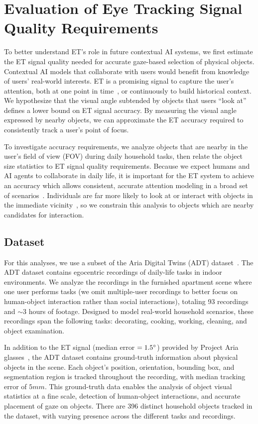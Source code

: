 \section{Evaluation of Eye Tracking Signal Quality Requirements}

To better understand ET's role in future contextual AI systems, we first estimate the ET signal quality needed for accurate gaze-based selection of physical objects.  Contextual AI models that collaborate with users would benefit from knowledge of users' real-world interests.  ET is a promising signal to capture the user's attention, both at one point in time~\cite{konrad_gazegpt_2024}, or continuously to build historical context.  We hypothesize that the visual angle subtended by objects that users ``look at'' defines a lower bound on ET signal accuracy.  By measuring the visual angle expressed by nearby objects, we can approximate the ET accuracy required to consistently track a user's point of focus.

To investigate accuracy requirements, we analyze objects that are nearby in the user's field of view (FOV) during daily household tasks, then relate the object size statistics to ET signal quality requirements.  Because we expect humans and AI agents to collaborate in daily life, it is important for the ET system to achieve an accuracy which allows consistent, accurate attention modeling in a broad set of scenarios~\cite{feit2017toward}.  Individuals are far more likely to look at or interact with objects in the immediate vicinity~\cite{ballendat_proxemic_2010}, so we constrain this analysis to objects which are nearby candidates for interaction.

\subsection{Dataset}

For this analyses, we use a subset of the Aria Digital Twins (ADT) dataset~\cite{pan_adt_2023}.  The ADT dataset contains egocentric recordings of daily-life tasks in indoor environments.  We analyze the recordings in the furnished apartment scene where one user performs tasks (we omit multiple-user recordings to better focus on human-object interaction rather than social interactions), totaling 93 recordings and $\sim$3 hours of footage.  Designed to model real-world household scenarios, these recordings span the following tasks:  decorating, cooking, working, cleaning, and object examination.

In addition to the ET signal (median error $= 1.5\degree$) provided by Project Aria glasses~\cite{engel_aria_2023}, the ADT dataset contains ground-truth information about physical objects in the scene.  Each object's position, orientation, bounding box, and segmentation region is tracked throughout the recording, with median tracking error of $5 mm$.  This ground-truth data enables the analysis of object visual statistics at a fine scale, detection of human-object interactions, and accurate placement of gaze on objects.  There are 396 distinct household objects tracked in the dataset, with varying presence across the different tasks and recordings.

